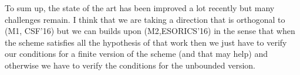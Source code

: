 To sum up, the state of the art has been improved a lot recently but many challenges remain.
I think that we are taking a direction that is orthogonal to (M1, CSF'16) but we can builds upon (M2,ESORICS'16)
in the sense that when the scheme satisfies all the hypothesis of that work then we just have to verify our conditions for
a finite version of the scheme (and that may help) and otherwise we have to verify the conditions for the unbounded version.




